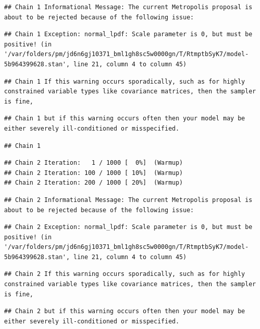 \documentclass[
]{book}
\begin{document}
\begin{verbatim}
## Chain 1 Informational Message: The current Metropolis proposal is about to be rejected because of the following issue:
\end{verbatim}

\begin{verbatim}
## Chain 1 Exception: normal_lpdf: Scale parameter is 0, but must be positive! (in '/var/folders/pm/jd6n6gj10371_bml1gh8sc5w0000gn/T/RtmptbSyK7/model-5b964399628.stan', line 21, column 4 to column 45)
\end{verbatim}

\begin{verbatim}
## Chain 1 If this warning occurs sporadically, such as for highly constrained variable types like covariance matrices, then the sampler is fine,
\end{verbatim}

\begin{verbatim}
## Chain 1 but if this warning occurs often then your model may be either severely ill-conditioned or misspecified.
\end{verbatim}

\begin{verbatim}
## Chain 1
\end{verbatim}

\begin{verbatim}
## Chain 2 Iteration:   1 / 1000 [  0%]  (Warmup) 
## Chain 2 Iteration: 100 / 1000 [ 10%]  (Warmup) 
## Chain 2 Iteration: 200 / 1000 [ 20%]  (Warmup)
\end{verbatim}

\begin{verbatim}
## Chain 2 Informational Message: The current Metropolis proposal is about to be rejected because of the following issue:
\end{verbatim}

\begin{verbatim}
## Chain 2 Exception: normal_lpdf: Scale parameter is 0, but must be positive! (in '/var/folders/pm/jd6n6gj10371_bml1gh8sc5w0000gn/T/RtmptbSyK7/model-5b964399628.stan', line 21, column 4 to column 45)
\end{verbatim}

\begin{verbatim}
## Chain 2 If this warning occurs sporadically, such as for highly constrained variable types like covariance matrices, then the sampler is fine,
\end{verbatim}

\begin{verbatim}
## Chain 2 but if this warning occurs often then your model may be either severely ill-conditioned or misspecified.
\end{verbatim}
\end{document}
